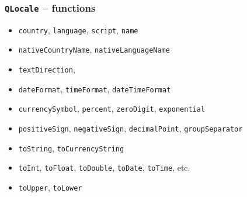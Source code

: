 \begin{frame}
  \frametitle{\texttt{QLocale} -- functions}
  \small
  \begin{itemize}
    \item \texttt{country}, \texttt{language}, \texttt{script}, \texttt{name}
    \item \texttt{nativeCountryName}, \texttt{nativeLanguageName}
    \item \texttt{textDirection},
    \item \texttt{dateFormat}, \texttt{timeFormat}, \texttt{dateTimeFormat}
    \item \texttt{currencySymbol}, \texttt{percent}, \texttt{zeroDigit},
      \texttt{exponential}
    \item \texttt{positiveSign}, \texttt{negativeSign}, \texttt{decimalPoint},
      \texttt{groupSeparator}
    \item \texttt{toString}, \texttt{toCurrencyString}
    \item \texttt{toInt}, \texttt{toFloat}, \texttt{toDouble},
      \texttt{toDate}, \texttt{toTime}, etc.
    \item \texttt{toUpper}, \texttt{toLower}
      
  \end{itemize}
\end{frame}

